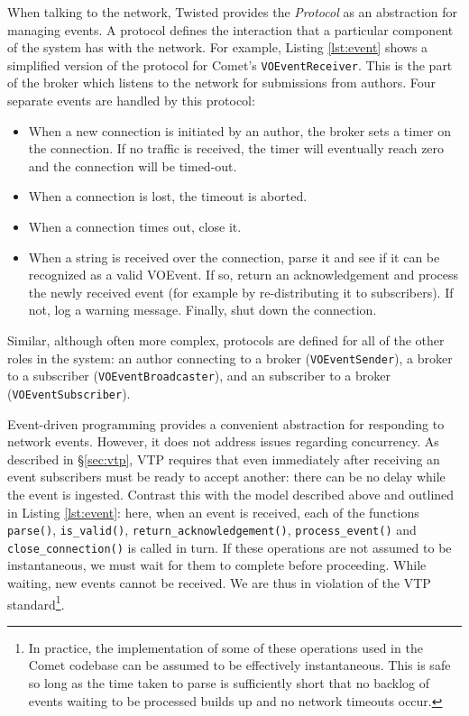 \documentclass[5p,authoryear]{elsarticle}
\begin{document}
When talking to the network, Twisted provides the \textit{Protocol} as an
abstraction for managing events. A protocol defines the interaction that a
particular component of the system has with the network. For example, Listing
\ref{lst:event} shows a simplified version of the protocol for Comet's
\texttt{VOEventReceiver}. This is the part of the broker which listens to the
network for submissions from authors. Four separate events are handled by this
protocol:

\begin{itemize}

\item{When a new connection is initiated by an author, the broker sets a
timer on the connection. If no traffic is received, the timer will eventually
reach zero and the connection will be timed-out.}

\item{When a connection is lost, the timeout is aborted.}

\item{When a connection times out, close it.}

\item{When a string is received over the connection, parse it and see if it
can be recognized as a valid VOEvent. If so, return an acknowledgement and
process the newly received event (for example by re-distributing it to
subscribers). If not, log a warning message. Finally, shut down the
connection.}

\end{itemize}

Similar, although often more complex, protocols are defined for all of the
other roles in the system: an author connecting to a broker
(\texttt{VOEventSender}), a broker to a subscriber
(\texttt{VOEventBroadcaster}), and an subscriber to a broker
(\texttt{VOEventSubscriber}).

Event-driven programming provides a convenient abstraction for responding to
network events. However, it does not address issues regarding concurrency. As
described in \S\ref{sec:vtp}, VTP requires that even immediately after
receiving an event subscribers must be ready to accept another: there can be
no delay while the event is ingested. Contrast this with the model described
above and outlined in Listing \ref{lst:event}: here, when an event is
received, each of the functions \texttt{parse()}, \texttt{is\_valid()},
\texttt{return\_acknowledgement()}, \texttt{process\_event()} and
\texttt{close\_connection()} is called in turn.  If these operations are not
assumed to be instantaneous, we must wait for them to complete before
proceeding. While waiting, new events cannot be received.  We are thus in
violation of the VTP standard\footnote{In practice, the implementation of some
of these operations used in the Comet codebase can be assumed to be
effectively instantaneous.  This is safe so long as the time taken to parse is
sufficiently short that no backlog of events waiting to be processed  builds
up and no network timeouts occur.}.
\end{document}

